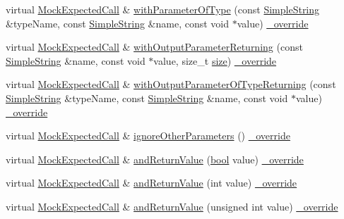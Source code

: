 \begin{DoxyCompactItemize}
\item 
virtual \hyperlink{class_mock_expected_call}{Mock\+Expected\+Call} \& \hyperlink{class_mock_expected_call_composite_a8f5fea7c1dbca849ffd8a46ceaa3ac00}{with\+Parameter\+Of\+Type} (const \hyperlink{class_simple_string}{Simple\+String} \&type\+Name, const \hyperlink{class_simple_string}{Simple\+String} \&name, const void $\ast$value) \hyperlink{_cpp_u_test_config_8h_a049bea15dd750e15869863c94c1efc3b}{\+\_\+override}
\item 
virtual \hyperlink{class_mock_expected_call}{Mock\+Expected\+Call} \& \hyperlink{class_mock_expected_call_composite_a4f3a5314e637a798f9aed13536b8b663}{with\+Output\+Parameter\+Returning} (const \hyperlink{class_simple_string}{Simple\+String} \&name, const void $\ast$value, size\+\_\+t \hyperlink{gst__avb__playbin_8c_a439227feff9d7f55384e8780cfc2eb82}{size}) \hyperlink{_cpp_u_test_config_8h_a049bea15dd750e15869863c94c1efc3b}{\+\_\+override}
\item 
virtual \hyperlink{class_mock_expected_call}{Mock\+Expected\+Call} \& \hyperlink{class_mock_expected_call_composite_a06e26c3b748887a5ad7b696576f0cee3}{with\+Output\+Parameter\+Of\+Type\+Returning} (const \hyperlink{class_simple_string}{Simple\+String} \&type\+Name, const \hyperlink{class_simple_string}{Simple\+String} \&name, const void $\ast$value) \hyperlink{_cpp_u_test_config_8h_a049bea15dd750e15869863c94c1efc3b}{\+\_\+override}
\item 
virtual \hyperlink{class_mock_expected_call}{Mock\+Expected\+Call} \& \hyperlink{class_mock_expected_call_composite_a390cf5728ae3f281e36aeb9e069c35be}{ignore\+Other\+Parameters} () \hyperlink{_cpp_u_test_config_8h_a049bea15dd750e15869863c94c1efc3b}{\+\_\+override}
\item 
virtual \hyperlink{class_mock_expected_call}{Mock\+Expected\+Call} \& \hyperlink{class_mock_expected_call_composite_aa4f0e19f8446f5ff4843f5ab7602b713}{and\+Return\+Value} (\hyperlink{avb__gptp_8h_af6a258d8f3ee5206d682d799316314b1}{bool} value) \hyperlink{_cpp_u_test_config_8h_a049bea15dd750e15869863c94c1efc3b}{\+\_\+override}
\item 
virtual \hyperlink{class_mock_expected_call}{Mock\+Expected\+Call} \& \hyperlink{class_mock_expected_call_composite_a980d2b47c18fde199906572aaa920a00}{and\+Return\+Value} (int value) \hyperlink{_cpp_u_test_config_8h_a049bea15dd750e15869863c94c1efc3b}{\+\_\+override}
\item 
virtual \hyperlink{class_mock_expected_call}{Mock\+Expected\+Call} \& \hyperlink{class_mock_expected_call_composite_ab064498114c11667f281bee69963adbe}{and\+Return\+Value} (unsigned int value) \hyperlink{_cpp_u_test_config_8h_a049bea15dd750e15869863c94c1efc3b}{\+\_\+override}

\end{DoxyCompactItemize}

